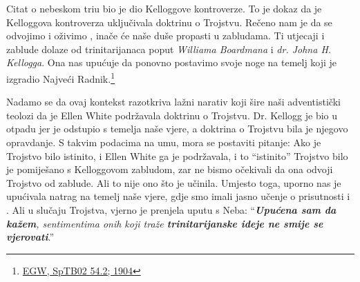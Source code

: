 Citat o nebeskom triu bio je dio Kelloggove kontroverze. To je dokaz da je Kelloggova kontroverza uključivala doktrinu o Trojstvu. Rečeno nam je da se odvojimo  i oživimo , inače će naše duše propasti u zabludama. Ti utjecaji i zablude dolaze od trinitarijanaca poput \textit{Williama Boardmana} i \textit{dr. Johna H. Kellogga}. Ona nas upućuje da ponovno postavimo svoje noge na temelj koji je izgradio Najveći Radnik.\footnote{\href{https://egwwritings.org/?ref=en_SpTB02.54.2&para=417.276}{EGW, SpTB02 54.2; 1904}}

Nadamo se da ovaj kontekst razotkriva lažni narativ koji šire naši adventistički teolozi da je Ellen White podržavala doktrinu o Trojstvu. Dr. Kellogg je bio u otpadu jer je odstupio s temelja naše vjere, a doktrina o Trojstvu bila je njegovo opravdanje. S takvim podacima na umu, mora se postaviti pitanje: Ako je Trojstvo bilo istinito, i Ellen White ga je podržavala, i to “istinito” Trojstvo bilo je pomiješano s Kelloggovom zabludom, zar ne bismo očekivali da ona odvoji Trojstvo od zablude. Ali to nije ono što je učinila. Umjesto toga, uporno nas je upućivala natrag na temelj naše vjere, gdje smo imali jasno učenje o prisutnosti i . Ali u slučaju Trojstva, vjerno je prenjela uputu s Neba: “\textit{\textbf{Upućena sam da kažem}, sentimentima onih koji traže \textbf{trinitarijanske ideje ne smije se vjerovati}}.”





% 
